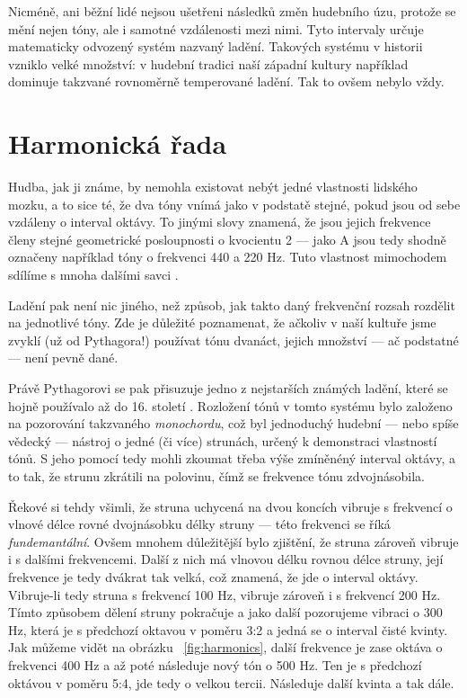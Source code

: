 \documentclass[12pt]{article}
\begin{document}
Nicméně, ani běžní lidé nejsou ušetřeni následků změn hudebního úzu, protože se mění nejen tóny, ale i samotné vzdálenosti mezi nimi. Tyto intervaly určuje matematicky odvozený systém nazvaný ladění. Takových systému v historii vzniklo velké množství: v hudební tradici naší západní kultury například dominuje takzvané rovnoměrně temperované ladění. Tak to ovšem nebylo vždy.

\section{Harmonická řada}

Hudba, jak ji známe, by nemohla existovat nebýt jedné vlastnosti lidského mozku, a to sice té, že dva tóny vnímá jako v podstatě stejné, pokud jsou od sebe vzdáleny o interval oktávy. To jinými slovy znamená, že jsou jejich frekvence členy stejné geometrické posloupnosti o kvocientu 2 — jako A jsou tedy shodně označeny například tóny o frekvenci 440 a 220 Hz. Tuto vlastnost mimochodem sdílíme s mnoha dalšími savci \cite{octave_circularity}.

Ladění pak není nic jiného, než způsob, jak takto daný frekvenční rozsah rozdělit na jednotlivé tóny. Zde je důležité poznamenat, že ačkoliv v naší kultuře jsme zvyklí (už od Pythagora!) používat tónu dvanáct, jejich množství — ač podstatné — není pevně dané. 

Právě Pythagorovi se pak přisuzuje jedno z nejstarších známých ladění, které se hojně používalo až do 16. století \cite{smolka}. Rozložení tónů v tomto systému bylo založeno na pozorování takzvaného \emph{monochordu}, což byl jednoduchý hudební — nebo spíše vědecký — nástroj o jedné (či více) strunách, určený k demonstraci vlastností tónů. S jeho pomocí tedy mohli zkoumat třeba výše zmíněnéný interval oktávy, a to tak, že strunu zkrátili na polovinu, čímž se frekvence tónu zdvojnásobila.

Řekové si tehdy všimli, že struna uchycená na dvou koncích vibruje s frekvencí o vlnové délce rovné dvojnásobku délky struny — této frekvenci se říká \emph{fundemantální}. Ovšem mnohem důležitější bylo zjištění, že struna zároveň vibruje i s dalšími frekvencemi. Další z nich má vlnovou délku rovnou délce struny, její frekvence je tedy dvákrat tak velká, což znamená, že jde o interval oktávy. Vibruje-li tedy struna s frekvencí 100 Hz, vibruje zároveň i s frekvencí 200 Hz. Tímto způsobem dělení struny pokračuje a jako další pozorujeme vibraci o 300 Hz, která je s předchozí oktavou v poměru 3:2 a jedná se o interval čisté kvinty. Jak můžeme vidět na obrázku ~\ref{fig:harmonics}, další frekvence je zase oktáva o frekvenci 400 Hz a až poté následuje nový tón o 500 Hz. Ten je s předchozí oktávou v poměru 5:4, jde tedy o velkou tercii. Následuje další kvinta a tak dále.
\end{document}
